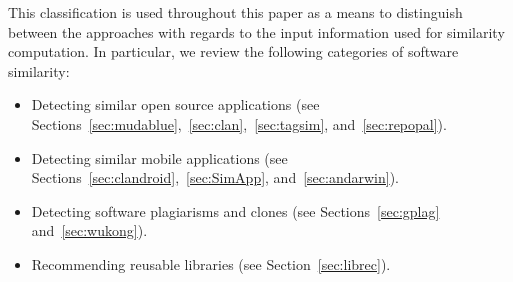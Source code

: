 This classification is used throughout this paper as a means to distinguish between the approaches with regards to the input information used for similarity computation. In particular, we review the following categories of software similarity:

\begin{itemize}
	\item Detecting similar open source applications (see Sections~\ref{sec:mudablue},~\ref{sec:clan},~\ref{sec:tagsim}, and~\ref{sec:repopal}).
	\item Detecting similar mobile applications (see Sections~\ref{sec:clandroid},~\ref{sec:SimApp}, and~\ref{sec:andarwin}).
	\item Detecting software plagiarisms and clones (see Sections~\ref{sec:gplag} and~\ref{sec:wukong}).
	\item Recommending reusable libraries (see Section~\ref{sec:librec}).
\end{itemize}





